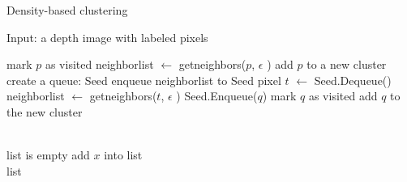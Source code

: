 \begin{algorithm}[t]
 \caption{Density-based clustering}
 
\begin{algorithmic}
 \State Input: a depth image with labeled pixels

      \State mark $p$ as visited
         \State neighbor\textunderscore list $\gets$ get\textunderscore neighbors($p$, $\epsilon$ )
            \State add $p$ to a new cluster
            \State create a queue: Seed
            \State enqueue neighbor\textunderscore list to Seed
                \State pixel $t$ $\gets$ Seed.Dequeue()
                \State neighbor\textunderscore list $\gets$ get\textunderscore neighbors($t$, $\epsilon$ )
                      \State Seed.Enqueue($q$)
                      \State mark $q$ as visited
                      \State add $q$ to the new cluster
                    \EndIf
                   \EndFor 
                \EndIf
            \EndWhile
         \EndIf

  \EndFor
\\
	\State list is empty	
			\State add $x$ into list
		\EndIf 	
 	\EndFor  	
 	\\
 	\Return list
\EndFunction

\end{algorithmic}
\end{algorithm}


